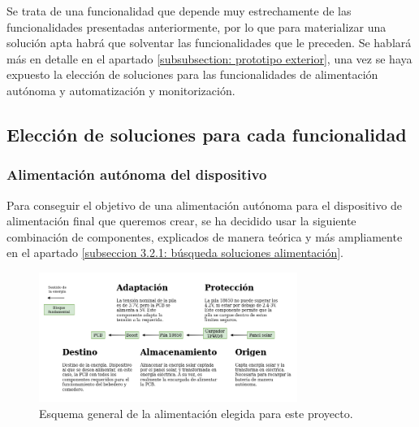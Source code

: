 \documentclass[12pt]{article}
\begin{document}
	\noindent Se trata de una funcionalidad que depende muy estrechamente de las funcionalidades presentadas anteriormente, por lo que para materializar una solución apta habrá que solventar las funcionalidades que le preceden. Se hablará más en detalle en el apartado \ref{subsubsection: prototipo exterior}, una vez se haya expuesto la elección de soluciones para las funcionalidades de alimentación autónoma y automatización y monitorización.
	\pagebreak
	
	\subsection[Elección soluciones]{Elección de soluciones para cada funcionalidad}
	\label{Subsección 3.3: elección de soluciones para cada funcionalidad}
	
	\subsubsection{Alimentación autónoma del dispositivo}
	
	\noindent Para conseguir el objetivo de una alimentación autónoma para el dispositivo de alimentación final que queremos crear, se ha decidido usar la siguiente combinación de componentes, explicados de manera teórica y más ampliamente en el apartado \ref{subseccion 3.2.1: búsqueda soluciones alimentación}.
	
	\begin{figure}[h!]
		\begin{center}
			\includegraphics[width=0.75\textwidth]{img/conexiones tfg-alimentacion.png}
			\caption{Esquema general de la alimentación elegida para este proyecto.}
			\label{Alimentación: esquema general}
		\end{center}
	\end{figure}
	
\end{document}
